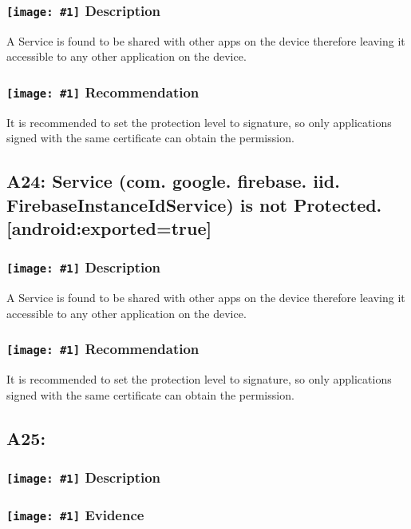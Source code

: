 \documentclass[12p]{article}
\newcommand{\icon}[1]{\texttt{[image: \#1]}}
\begin{document}
\subsubsection*{\protect\icon{/home/miki/Documents/GITHUB/AndroidPermissions/python/vulns/report_icons/basic_sheet.png} Description}
A Service is found to be shared with other apps on the device therefore leaving it accessible to any other application on the device.
\subsubsection*{\protect\icon{/home/miki/Documents/GITHUB/AndroidPermissions/python/vulns/report_icons/basic_todo.png} Recommendation}
It is recommended to set the protection level to signature, so only applications signed with the same certificate can obtain the permission.
\subsection{A24: Service (com. google. firebase. iid. FirebaseInstanceIdService) is not Protected. [android:exported=true]}
\subsubsection*{\protect\icon{/home/miki/Documents/GITHUB/AndroidPermissions/python/vulns/report_icons/basic_sheet.png} Description}
A Service is found to be shared with other apps on the device therefore leaving it accessible to any other application on the device.
\subsubsection*{\protect\icon{/home/miki/Documents/GITHUB/AndroidPermissions/python/vulns/report_icons/basic_todo.png} Recommendation}
It is recommended to set the protection level to signature, so only applications signed with the same certificate can obtain the permission.
\subsection{A25: }
\subsubsection*{\protect\icon{/home/miki/Documents/GITHUB/AndroidPermissions/python/vulns/report_icons/basic_sheet.png} Description}

\subsubsection*{\protect\icon{/home/miki/Documents/GITHUB/AndroidPermissions/python/vulns/report_icons/basic_magnifier.png} Evidence}
\end{document}
